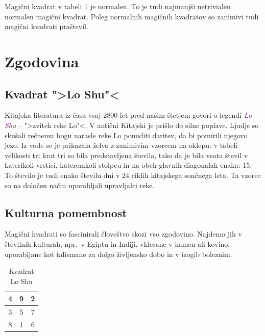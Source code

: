 \documentclass[a4paper,12pt]{article}
\begin{document}
Magični kvadrat v tabeli 1 je normalen.
To je tudi najmanjši netrivialen normalen magični kvadrat.
Poleg normalnih magičnih kvadratov so zanimivi tudi magični kvadrati praštevil.


\section{Zgodovina}

\subsection{Kvadrat ">Lo Shu"<}

Kitajska literatura iz časa vsaj 2800 let pred našim štetjem govori o legendi
\textcolor{purple}{\emph{Lo Shu}} -- ">zvitek reke Lo"<. V antični Kitajski je prišlo do
silne poplave. Ljudje so skušali rečnemu bogu narasle reke Lo ponuditi daritev,
da bi pomirili njegovo jezo. Iz vode se je prikazala želva z zanimivim vzorcem
na oklepu: v tabeli velikosti tri krat tri so bila predstavljena števila, tako
da je bila vsota števil v katerikoli vrstici, kateremkoli stolpcu in na obeh
glavnih diagonalah enaka: 15. To število je tudi enako številu dni v 24 ciklih
kitajskega sončnega leta. Ta vzorec so na določen način uporabljali upravljalci
reke.



\subsection{Kulturna pomembnost}

Magični kvadrati so fascinirali človeštvo skozi vso zgodovino. Najdemo jih
v številnih kulturah, npr.\ v Egiptu in Indiji, vklesane v kamen ali
kovino, uporabljane kot talismane za dolgo življensko dobo in v
izogib boleznim.
\begin{table}[ht]
   \centering
   \caption{Kvadrat Lo Shu} %
   \label{table:loshu} %
   \begin{tabular}{|c|c|c|}
   \hline
   4 & 9 & 2 \\ \hline
   3 & 5 & 7 \\ \hline
   8 & 1 & 6 \\ \hline
   \end{tabular}
\end{table}
\end{document}
